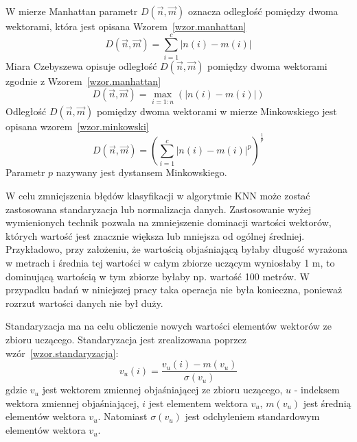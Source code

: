 \documentclass[a4paper,twoside,12pt]{book}
\begin{document}
    W mierze Manhattan parametr $D(\overrightarrow{n},\overrightarrow{m})$ oznacza odległość pomiędzy dwoma wektorami,
    która jest opisana Wzorem~\ref{wzor.manhattan}
    \large
    \begin{equation}
        D(\overrightarrow{n},\overrightarrow{m})=\sum_{i=1}^{c}\left |n(i)-m(i)\right |
        \label{wzor.manhattan}
    \end{equation}
    \normalsize
    Miara Czebyszewa opisuje odległość $D(\overrightarrow{n},\overrightarrow{m})$ pomiędzy dwoma wektorami zgodnie z Wzorem~\ref{wzor.manhattan}
    \large
    \begin{equation}
        D(\overrightarrow{n},\overrightarrow{m})=\max_{i=1:n}( \left |n(i)-m(i) \right |)
        \label{wzor.czebyszew}
    \end{equation}
    \normalsize
    Odległość $D(\overrightarrow{n},\overrightarrow{m})$ pomiędzy dwoma wektorami w mierze Minkowskiego jest opisana
    wzorem~\ref{wzor.minkowski}
    \large
    \begin{equation}
        D(\overrightarrow{n},\overrightarrow{m})=(\sum_{i=1}^{c} \left |n(i)-m(i) \right |^{p})^{\frac{1}{p}}
        \label{wzor.minkowski}
    \end{equation}
    \normalsize
    Parametr $p$ nazywany jest dystansem Minkowskiego.

    W celu zmniejszenia błędów klasyfikacji w algorytmie KNN może zostać zastosowana standaryzacja lub normalizacja danych.
    Zastosowanie wyżej wymienionych technik pozwala na zmniejszenie dominacji wartości wektorów, których wartość jest
    znacznie większa lub mniejsza od ogólnej średniej. Przykładowo, przy założeniu, że
    wartością objaśniającą byłaby długość wyrażona w metrach i średnia tej wartości w całym zbiorze uczącym
    wyniosłaby 1 m,
    to dominującą wartością w tym zbiorze byłaby np. wartość 100 metrów.
    W przypadku badań w niniejszej pracy taka operacja nie była konieczna, ponieważ rozrzut wartości danych nie był
    duży.

    Standaryzacja ma na celu obliczenie nowych wartości elementów wektorów ze zbioru uczącego.
    Standaryzacja jest zrealizowana poprzez wzór~\ref{wzor.standaryzacja}:
    \large
    \begin{equation}
    {v}
        _{u}(i) = \frac{{v}_{u}(i)-m({v}_{u})}{\sigma({v}_{u})}
        \label{wzor.standaryzacja}
    \end{equation}
    \normalsize
    gdzie ${v}_{u}$ jest wektorem zmiennej objaśniającej ze zbioru uczącego, $u$ - indeksem wektora zmiennej
    objaśniającej, $i$ jest elementem wektora ${v}_{u}$, $m({v}_{u})$ jest średnią elementów wektora
    ${v}_{u}$. Natomiast $\sigma({v}_{u})$ jest odchyleniem standardowym elementów wektora ${v}_{u}$.
\end{document}
